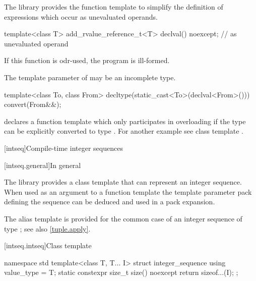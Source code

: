 \pnum
The library provides the function template  to simplify the definition of
expressions which occur as unevaluated operands.

%
\begin{itemdecl}
template<class T> add_rvalue_reference_t<T> declval() noexcept;    // as unevaluated operand
\end{itemdecl}

\begin{itemdescr}
\pnum
\remarks
If this function is odr-used, the program is ill-formed.

\pnum
\remarks
The template parameter  of  may be an incomplete type.
\end{itemdescr}

\pnum
\begin{example}
\begin{codeblock}
template<class To, class From> decltype(static_cast<To>(declval<From>())) convert(From&&);
\end{codeblock}
declares a function template  which only participates in overloading if the
type  can be explicitly converted to type . For another example see class
template .
\end{example}

[intseq]{Compile-time integer sequences}

[intseq.general]{In general}

\pnum
The library provides a class template that can represent an integer sequence.
When used as an argument to a function template the template parameter pack defining the
sequence can be deduced and used in a pack expansion.
\begin{note}
The  alias template is provided for the common case of
an integer sequence of type ; see also \ref{tuple.apply}.
\end{note}

[intseq.intseq]{Class template }

%
%
\begin{codeblock}
namespace std {
  template<class T, T... I> struct integer_sequence {
    using value_type = T;
    static constexpr size_t size() noexcept { return sizeof...(I); }
  };
}
\end{codeblock}

